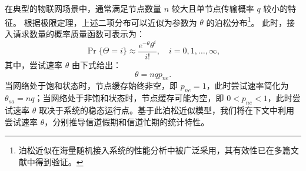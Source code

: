 在典型的物联网场景中，通常满足节点数量 $n$ 较大且单节点传输概率 $q$ 较小的特征。
根据极限定理，上述二项分布可以近似为参数为 $\theta$ 的泊松分布\footnote{泊松近似在海量随机接入系统的性能分析中被广泛采用，其有效性已在多篇文献中得到验证。}。
此时，接入请求数量的概率质量函数可表示为：
\begin{equation}
	\label{eq:poisson_prob}
	\Pr \{\Theta = i\} \approx \frac{e^{-\theta} \theta^i}{i!}, \quad i = 0, 1, \dots, \infty,
\end{equation}
其中，尝试速率 $\theta$ 由下式给出：
\begin{equation}
	\label{eq:theta_general}
	\theta = n q p_{ne}.
\end{equation}
当网络处于饱和状态时，节点缓存始终非空，即 $p_{ne} = 1$，此时尝试速率简化为 $\theta_{sa} = nq$；当网络处于非饱和状态时，节点缓存可能为空，即 $0 < p_{ne} < 1$，此时尝试速率 $\theta$ 取决于系统的稳态运行点。基于此泊松近似模型，我们将在下文中利用尝试速率 $\theta$，分别推导信道假期和信道忙期的统计特性。

